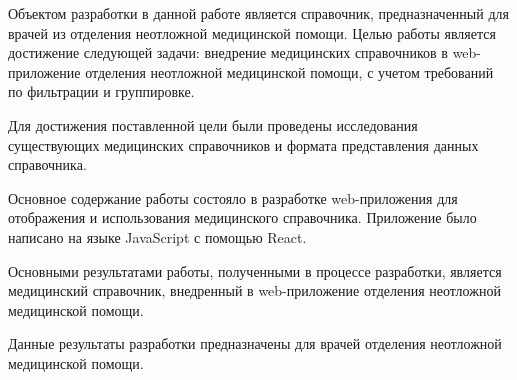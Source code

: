 \abstract %


Объектом разработки в данной работе является справочник, предназначенный для врачей из отделения неотложной медицинской помощи.
Целью работы является достижение следующей задачи: внедрение медицинских справочников в web-приложение отделения неотложной медицинской помощи, с учетом требований по фильтрации и группировке. 

Для достижения поставленной цели были проведены исследования существующих медицинских справочников и формата представления данных справочника. 

Основное содержание работы состояло в разработке web-приложения для отображения и использования медицинского справочника. Приложение было написано на языке JavaScript с помощью React. 

Основными результатами работы, полученными в процессе разработки, является медицинский справочник, внедренный в web-приложение отделения неотложной медицинской помощи.

Данные результаты разработки предназначены для врачей отделения неотложной медицинской помощи.